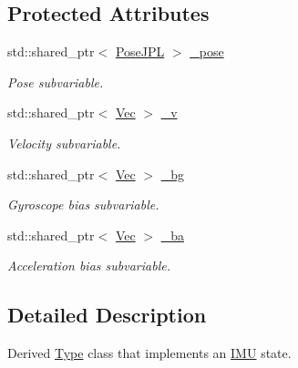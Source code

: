 \subsection*{Protected Attributes}
\begin{DoxyCompactItemize}
\item 
\mbox{\label{classov__type_1_1IMU_ad90f5e8c1905d099de0ab908a072b112}} 
std\+::shared\+\_\+ptr$<$ \hyperlink{classov__type_1_1PoseJPL}{Pose\+J\+PL} $>$ \hyperlink{classov__type_1_1IMU_ad90f5e8c1905d099de0ab908a072b112}{\+\_\+pose}
\begin{DoxyCompactList}\small\item\em Pose subvariable. \end{DoxyCompactList}\item 
\mbox{\label{classov__type_1_1IMU_ac1149c2a1b5576e56700ed2f7da3e87d}} 
std\+::shared\+\_\+ptr$<$ \hyperlink{classov__type_1_1Vec}{Vec} $>$ \hyperlink{classov__type_1_1IMU_ac1149c2a1b5576e56700ed2f7da3e87d}{\+\_\+v}
\begin{DoxyCompactList}\small\item\em Velocity subvariable. \end{DoxyCompactList}\item 
\mbox{\label{classov__type_1_1IMU_ac3dac355b5fbcc80bc59ea05808dc2f8}} 
std\+::shared\+\_\+ptr$<$ \hyperlink{classov__type_1_1Vec}{Vec} $>$ \hyperlink{classov__type_1_1IMU_ac3dac355b5fbcc80bc59ea05808dc2f8}{\+\_\+bg}
\begin{DoxyCompactList}\small\item\em Gyroscope bias subvariable. \end{DoxyCompactList}\item 
\mbox{\label{classov__type_1_1IMU_a5b2bc57054d02e37355f52799cc9df15}} 
std\+::shared\+\_\+ptr$<$ \hyperlink{classov__type_1_1Vec}{Vec} $>$ \hyperlink{classov__type_1_1IMU_a5b2bc57054d02e37355f52799cc9df15}{\+\_\+ba}
\begin{DoxyCompactList}\small\item\em Acceleration bias subvariable. \end{DoxyCompactList}\end{DoxyCompactItemize}


\subsection{Detailed Description}
Derived \hyperlink{classov__type_1_1Type}{Type} class that implements an \hyperlink{classov__type_1_1IMU}{I\+MU} state. 

